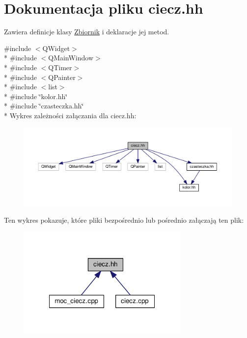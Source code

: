 \hypertarget{ciecz_8hh}{}\section{Dokumentacja pliku ciecz.\+hh}
\label{ciecz_8hh}


Zawiera definicje klasy \hyperlink{class_zbiornik}{Zbiornik} i deklaracje jej metod.  


{\ttfamily \#include $<$Q\+Widget$>$}\\*
{\ttfamily \#include $<$Q\+Main\+Window$>$}\\*
{\ttfamily \#include $<$Q\+Timer$>$}\\*
{\ttfamily \#include $<$Q\+Painter$>$}\\*
{\ttfamily \#include $<$list$>$}\\*
{\ttfamily \#include \char`\"{}kolor.\+hh\char`\"{}}\\*
{\ttfamily \#include \char`\"{}czasteczka.\+hh\char`\"{}}\\*
Wykres zależności załączania dla ciecz.\+hh\+:\nopagebreak
\begin{figure}[H]
\begin{center}
\leavevmode
\includegraphics[width=350pt]{ciecz_8hh__incl}
\end{center}
\end{figure}
Ten wykres pokazuje, które pliki bezpośrednio lub pośrednio załączają ten plik\+:\nopagebreak
\begin{figure}[H]
\begin{center}
\leavevmode
\includegraphics[width=239pt]{ciecz_8hh__dep__incl}
\end{center}
\end{figure}
